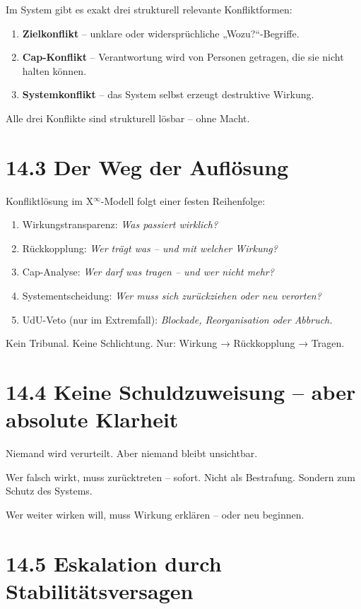 \documentclass[12pt,a4paper]{book}
\begin{document}
Im System gibt es exakt drei strukturell relevante Konfliktformen:

\begin{enumerate}
    \item \textbf{Zielkonflikt} – unklare oder widersprüchliche „Wozu?“-Begriffe.
    \item \textbf{Cap-Konflikt} – Verantwortung wird von Personen getragen, die sie nicht halten können.
    \item \textbf{Systemkonflikt} – das System selbst erzeugt destruktive Wirkung.
\end{enumerate}

Alle drei Konflikte sind strukturell lösbar – ohne Macht.

\section*{14.3 Der Weg der Auflösung}

Konfliktlösung im X$^\infty$-Modell folgt einer festen Reihenfolge:

\begin{enumerate}
    \item Wirkungstransparenz: \textit{Was passiert wirklich?}
    \item Rückkopplung: \textit{Wer trägt was – und mit welcher Wirkung?}
    \item Cap-Analyse: \textit{Wer darf was tragen – und wer nicht mehr?}
    \item Systementscheidung: \textit{Wer muss sich zurückziehen oder neu verorten?}
    \item UdU-Veto (nur im Extremfall): \textit{Blockade, Reorganisation oder Abbruch.}
\end{enumerate}

Kein Tribunal.  
Keine Schlichtung.  
Nur: Wirkung → Rückkopplung → Tragen.

\section*{14.4 Keine Schuldzuweisung – aber absolute Klarheit}

Niemand wird verurteilt.  
Aber niemand bleibt unsichtbar.

Wer falsch wirkt, muss zurücktreten – sofort.  
Nicht als Bestrafung.  
Sondern zum Schutz des Systems.

Wer weiter wirken will, muss Wirkung erklären – oder neu beginnen.

\section*{14.5 Eskalation durch Stabilitätsversagen}
\end{document}
